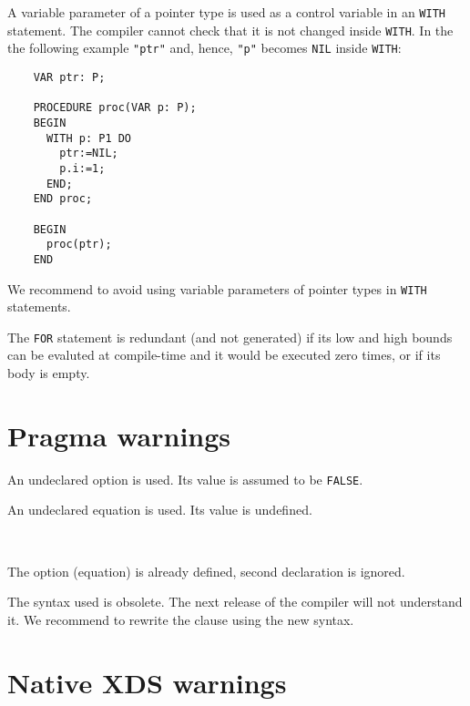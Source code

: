 
A variable parameter of a pointer type is used as a control variable in
an \ot{} \verb'WITH' statement. The compiler cannot check that it is not changed
inside \verb'WITH'. In the the following example \verb'"ptr"' and, hence, \verb'"p"' becomes
\verb'NIL' inside \verb'WITH':

\begin{verbatim}
    VAR ptr: P;

    PROCEDURE proc(VAR p: P);
    BEGIN
      WITH p: P1 DO
        ptr:=NIL;
        p.i:=1;
      END;
    END proc;

    BEGIN
      proc(ptr);
    END
\end{verbatim}

We recommend to avoid using variable parameters of pointer types in \verb'WITH'
statements.


The \verb'FOR' statement is redundant (and not generated) if its low and high
bounds can be evaluted at compile-time and it would be executed zero
times, or if its body is empty.


\section{Pragma warnings}


An undeclared option is used. Its value is assumed to be \verb'FALSE'.


An undeclared equation is used. Its value is undefined.

   \ifonline\else\\\fi
{}

The option (equation) is already defined, second declaration is ignored.


The syntax used is obsolete. The next release of the compiler will not
understand it. We recommend to rewrite the clause using the new syntax.


\section{Native XDS warnings}

